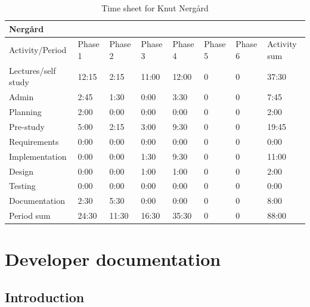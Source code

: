 \documentclass[11pt]{book}
\begin{document}
\begin{table}[H]
\centering
\begin{tabular}{| l | l | l | l | l | l | l | l |}
    \hline
    Nergård             &          &          &          &          &             &             &              \\ \hline         
    Activity/Period     & Phase 1  & Phase 2  & Phase  3 & Phase 4  & Phase 5     & Phase 6     & Activity sum \\ \hline
    Lectures/self study & 12:15    & 2:15     & 11:00    & 12:00    & 0           & 0           & 37:30        \\ \hline
    Admin               & 2:45     & 1:30     & 0:00     & 3:30     & 0           & 0           & 7:45         \\ \hline
    Planning            & 2:00     & 0:00     & 0:00     & 0:00     & 0           & 0           & 2:00         \\ \hline
    Pre-study           & 5:00     & 2:15     & 3:00     & 9:30     & 0           & 0           & 19:45        \\ \hline
    Requirements        & 0:00     & 0:00     & 0:00     & 0:00     & 0           & 0           & 0:00         \\ \hline
    Implementation      & 0:00     & 0:00     & 1:30     & 9:30     & 0           & 0           & 11:00        \\ \hline
    Design              & 0:00     & 0:00     & 1:00     & 1:00     & 0           & 0           & 2:00         \\ \hline
    Testing             & 0:00     & 0:00     & 0:00     & 0:00     & 0           & 0           & 0:00         \\ \hline
    Documentation       & 2:30     & 5:30     & 0:00     & 0:00     & 0           & 0           & 8:00         \\ \hline
    Period sum          & 24:30    & 11:30    & 16:30    & 35:30    & 0           & 0           & 88:00        \\ \hline
\end{tabular}
\caption{Time sheet for Knut Nergård}
\label{tab:appendix_timesheets_knut}
\end{table}

\chapter{Developer documentation}\label{chap:documentation}
\section{Introduction}
\end{document}
